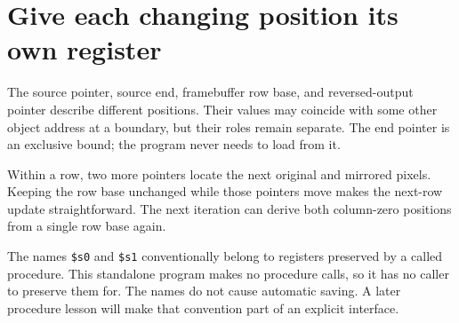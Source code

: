 \section{Give each changing position its own
  register}\label{003-eight-byte-sprite-p03-give-each-changing-position-its-own-register}

The source pointer, source end, framebuffer row base, and
reversed-output pointer describe different positions. Their values may
coincide with some other object address at a boundary, but their roles
remain separate. The end pointer is an exclusive bound; the program
never needs to load from it.

Within a row, two more pointers locate the next original and mirrored
pixels. Keeping the row base unchanged while those pointers move makes
the next-row update straightforward. The next iteration can derive both
column-zero positions from a single row base again.

The names \texttt{\$s0} and \texttt{\$s1} conventionally belong to
registers preserved by a called procedure. This standalone program makes
no procedure calls, so it has no caller to preserve them for. The names
do not cause automatic saving. A later procedure lesson will make that
convention part of an explicit interface.
